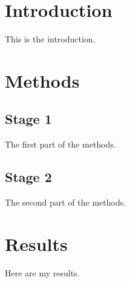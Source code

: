 \documentclass[a4paper,12pt]{report}
\begin{document}
\section{Introduction}
This is the introduction.

\section{Methods}

\subsection{Stage 1}
The first part of the methods.

\subsection{Stage 2}
The second part of the methods.

\section{Results}
Here are my results.
\end{document}

